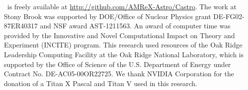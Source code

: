 \documentclass[twocolumn,times]{aastex62}
\newcommand{\castro}{{\sf Castro}}
\begin{document}
\acknowledgements \castro\ is freely available at
\url{http://github.com/AMReX-Astro/Castro}.  The work at Stony Brook
was supported by DOE/Office of Nuclear Physics grant DE-FG02-87ER40317
and NSF award AST-1211563.  An award of computer time was provided by
the Innovative and Novel Computational Impact on Theory and Experiment
(INCITE) program.  This research used resources of the Oak Ridge
Leadership Computing Facility at the Oak Ridge National Laboratory,
which is supported by the Office of Science of the U.S. Department of
Energy under Contract No. DE-AC05-00OR22725.  We thank NVIDIA Corporation
for the donation of a Titan X Pascal and Titan V used in this research.








\end{document}
